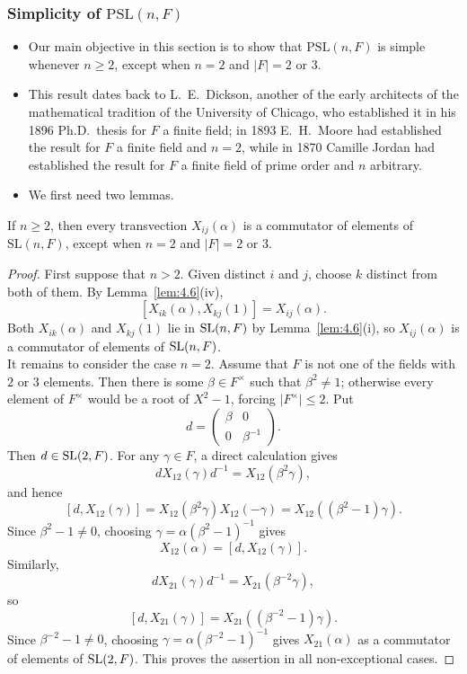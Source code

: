 \documentclass[../Odyssey_Project.tex]{subfiles}
\begin{document}
\subsubsection*{Simplicity of $\mathrm{PSL}(n,F)$}
\begin{itemize}
    \item Our main objective in this section is to show that $\mathrm{PSL}(n,F)$ is simple whenever $n \geq 2$, except when $n = 2$ and $|F| = 2$ or $3$.
    \item This result dates back to L.~E.~Dickson, another of the early architects of the mathematical tradition of the University of Chicago, who established it in his 1896 Ph.D.\ thesis for $F$ a finite field; in 1893 E.~H.~Moore had established the result for $F$ a finite field and $n = 2$, while in 1870 Camille Jordan had established the result for $F$ a finite field of prime order and $n$ arbitrary.
    \item We first need two lemmas.
\end{itemize}

\begin{lemma}
\label{lem:6.6}
If $n \geq 2$, then every transvection $X_{ij}(\alpha)$ is a commutator of elements of $\mathrm{SL}(n,F)$, except when $n = 2$ and $|F| = 2$ or $3$.
\end{lemma}
\begin{proof}
First suppose that $n>2$. Given distinct $i$ and $j$, choose $k$ distinct from both of them. By Lemma~\ref{lem:4.6}(iv),
\[
    [X_{ik}(\alpha),X_{kj}(1)]=X_{ij}(\alpha).
\]
Both $X_{ik}(\alpha)$ and $X_{kj}(1)$ lie in $\operatorname{SL}(n,F)$ by Lemma~\ref{lem:4.6}(i), so $X_{ij}(\alpha)$ is a commutator of elements of $\operatorname{SL}(n,F)$.\\
It remains to consider the case $n=2$. Assume that $F$ is not one of the fields with $2$ or $3$ elements. Then there is some $\beta\in F^\times$ such that $\beta^2\neq 1$; otherwise every element of $F^\times$ would be a root of $X^2-1$, forcing $\lvert F^\times\rvert\leq 2$. Put
\[
    d=
    \begin{pmatrix}
        \beta & 0\\
        0     & \beta^{-1}
    \end{pmatrix}.
\]
Then $d\in\operatorname{SL}(2,F)$. For any $\gamma\in F$, a direct calculation gives
\[
    dX_{12}(\gamma)d^{-1}=X_{12}(\beta^2\gamma),
\]
and hence
\[
    [d,X_{12}(\gamma)]
    =X_{12}(\beta^2\gamma)X_{12}(-\gamma)
    =X_{12}((\beta^2-1)\gamma).
\]
Since $\beta^2-1\neq 0$, choosing $\gamma=\alpha(\beta^2-1)^{-1}$ gives
\[
    X_{12}(\alpha)=[d,X_{12}(\gamma)].
\]
Similarly,
\[
    dX_{21}(\gamma)d^{-1}=X_{21}(\beta^{-2}\gamma),
\]
so
\[
    [d,X_{21}(\gamma)]=X_{21}((\beta^{-2}-1)\gamma).
\]
Since $\beta^{-2}-1\neq0$, choosing $\gamma=\alpha(\beta^{-2}-1)^{-1}$ gives $X_{21}(\alpha)$ as a commutator of elements of $\operatorname{SL}(2,F)$. This proves the assertion in all non-exceptional cases.
\end{proof}
\end{document}
